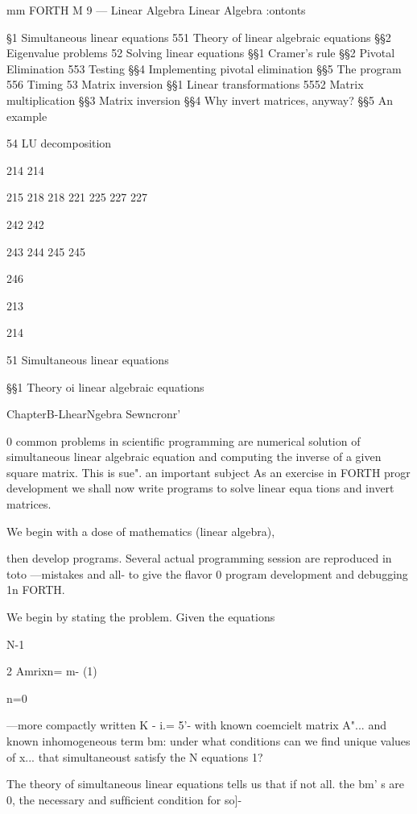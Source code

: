 mm FORTH M 9 — Linear Algebra
Linear Algebra
:ontonts

\S1 Simultaneous linear equations
551 Theory of linear algebraic equations
\S\S2 Eigenvalue problems
52 Solving linear equations
\S\S1 Cramer's rule
\S\S2 Pivotal Elimination
553 Testing
\S\S4 Implementing pivotal elimination
\S\S5 The program
556 Timing
53 Matrix inversion
\S\S1 Linear transformations
5552 Matrix multiplication
\S\S3 Matrix inversion
\S\S4 Why invert matrices, anyway?
\S\S5 An example

54 LU decomposition

214
214

215
218
218
221
225
227
227

242
242

243
244
245
245

246

213

214

51 Simultaneous linear equations

\S\S1 Theory oi linear algebraic equations

ChapterB-LhearNgebra Sewncronr'

      
 
   
 

0 common problems in scientiﬁc programming are
numerical solution of simultaneous linear algebraic equation
and computing the inverse of a given square matrix. This is sue".
an important subject As an exercise in FORTH progr
development we shall now write programs to solve linear equa
tions and invert matrices.

We begin with a dose of mathematics (linear algebra),

then develop programs. Several actual programming session
are reproduced in toto —mistakes and all- to give the flavor 0
program development and debugging 1n FORTH.

We begin by stating the problem. Given the equations

N-1

2 Amrixn= m- (1)

n=0

—more compactly written K - i.= 5'- with known coemcielt
matrix A"... and known inhomogeneous term bm: under what
conditions can we ﬁnd unique values of x... that simultaneoust
satisfy the N equations 1?

The theory of simultaneous linear equations tells us that if not all.
the bm' s are 0, the necessary and sufﬁcient condition for so]-

